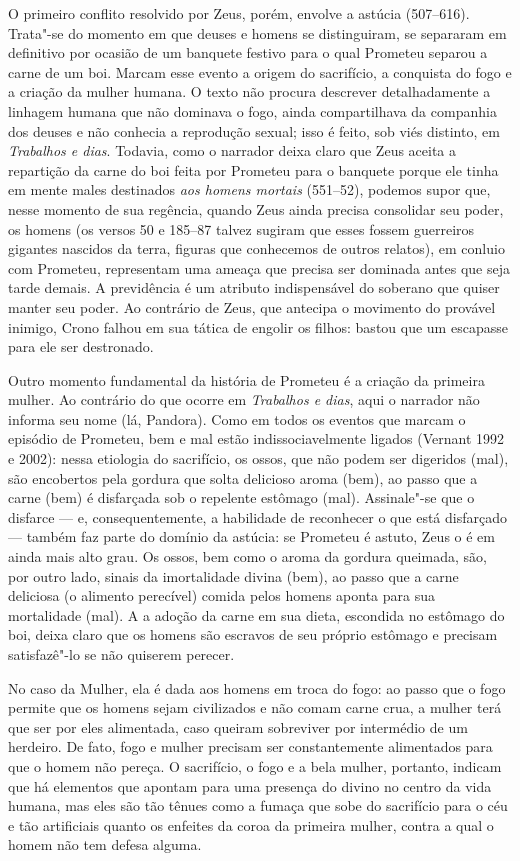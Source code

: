O primeiro conflito resolvido por Zeus, porém, envolve a astúcia
(507--616). Trata"-se do momento em que deuses e homens se distinguiram,
se separaram em definitivo por ocasião de um banquete festivo para o
qual Prometeu separou a carne de um boi. Marcam esse evento a origem do
sacrifício, a conquista do fogo e a criação da mulher humana. O texto
não procura descrever detalhadamente a linhagem humana que não dominava
o fogo, ainda compartilhava da companhia dos deuses e não conhecia a
reprodução sexual; isso é feito, sob viés distinto, em \emph{Trabalhos e
dias}. Todavia, como o narrador deixa claro que Zeus aceita a repartição
da carne do boi feita por Prometeu para o banquete porque ele tinha em
mente males destinados \emph{aos homens mortais} (551--52), podemos supor
que, nesse momento de sua regência, quando Zeus ainda precisa consolidar
seu poder, os homens (os versos 50 e 185--87 talvez sugiram que esses
fossem guerreiros gigantes nascidos da terra, figuras que conhecemos de
outros relatos), em conluio com Prometeu, representam uma ameaça que
precisa ser dominada antes que seja tarde demais. A previdência é um
atributo indispensável do soberano que quiser manter seu poder. Ao
contrário de Zeus, que antecipa o movimento do provável inimigo, Crono
falhou em sua tática de engolir os filhos: bastou que um escapasse para
ele ser destronado.

Outro momento fundamental da história de Prometeu é a criação da
primeira mulher. Ao contrário do que ocorre em \emph{Trabalhos e dias},
aqui o narrador não informa seu nome (lá, Pandora). Como em todos os
eventos que marcam o episódio de Prometeu, bem e mal estão
indissociavelmente ligados (Vernant 1992 e 2002): nessa etiologia do
sacrifício, os ossos, que não podem ser digeridos (mal), são encobertos
pela gordura que solta delicioso aroma (bem), ao passo que a carne (bem)
é disfarçada sob o repelente estômago (mal). Assinale"-se que o disfarce
--- e, consequentemente, a habilidade de reconhecer o que está disfarçado
--- também faz parte do domínio da astúcia: se Prometeu é astuto, Zeus o
é em ainda mais alto grau. Os ossos, bem como o aroma da gordura
queimada, são, por outro lado, sinais da imortalidade divina (bem), ao
passo que a carne deliciosa (o alimento perecível) comida pelos homens
aponta para sua mortalidade (mal). A a adoção da carne em sua dieta,
escondida no estômago do boi, deixa claro que os homens são escravos de
seu próprio estômago e precisam satisfazê"-lo se não quiserem perecer.

No caso da Mulher, ela é dada aos homens em troca do fogo: ao passo que
o fogo permite que os homens sejam civilizados e não comam carne crua, a
mulher terá que ser por eles alimentada, caso queiram sobreviver por
intermédio de um herdeiro. De fato, fogo e mulher precisam ser
constantemente alimentados para que o homem não pereça. O sacrifício, o
fogo e a bela mulher, portanto, indicam que há elementos que apontam
para uma presença do divino no centro da vida humana, mas eles são tão
tênues como a fumaça que sobe do sacrifício para o céu e tão artificiais
quanto os enfeites da coroa da primeira mulher, contra a qual o homem
não tem defesa alguma.

